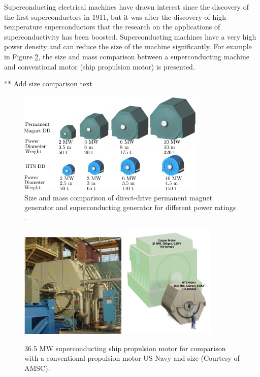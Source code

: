 \documentclass[a4paper, 11pt]{article} %
\begin{document}
Superconducting electrical machines have drawn interest since the discovery of the first superconductors in 1911, but it was after the discovery of high-temperature superconductors that the research on the applications of superconductivity has been boosted. Superconducting machines have a very high power density and can reduce the size of the machine significantly. For example in Figure \ref{amsc_36mw}, the size and mass comparison between a superconducting machine and conventional motor (ship propulsion motor) is presented.


** Add size comparison text

  \begin{figure}[t]
    \centering
    \includegraphics[width=0.8\textwidth]{amsc_ddpm_hts_comparison}
  	\caption{Size and mass comparison of direct-drive permanent magnet generator and superconducting generator for different power ratings \cite{amsc_presentation}.} 
  	\label{ddpm_hts_compare}
  \end{figure}


  \begin{figure}[t]
    \centering
    \includegraphics[width=0.45\textwidth]{36MW_AMSC}
    \includegraphics[width=0.4\textwidth]{amsc_36mw_compare}
    \caption{36.5 MW superconducting ship propulsion motor for comparison with a conventional propulsion motor US Navy and size  (Courtesy of AMSC).} 
    \label{amsc_36mw}
  \end{figure}
\end{document}
